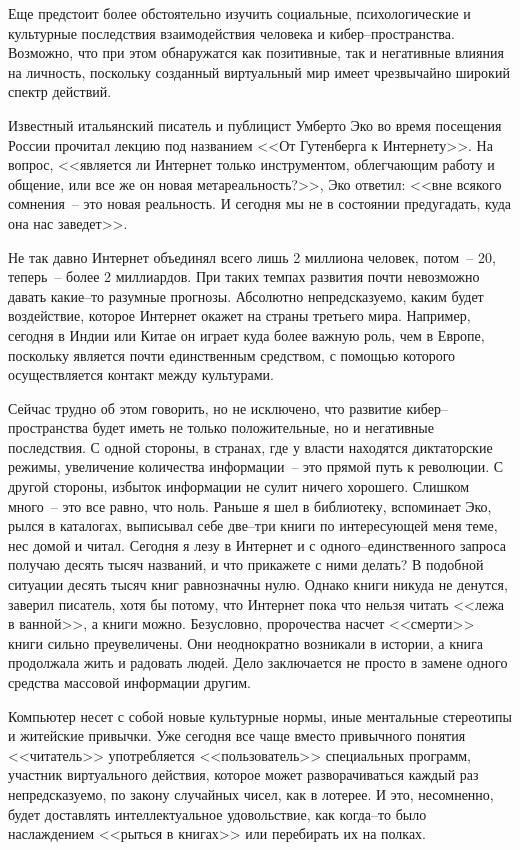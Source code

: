   Еще предстоит более обстоятельно изучить социальные, психологические и
  культурные последствия взаимодействия человека и кибер–пространства.
  Возможно, что при этом обнаружатся как позитивные, так и негативные влияния
  на личность, поскольку созданный виртуальный мир имеет чрезвычайно широкий
  спектр действий.
  
  Известный итальянский писатель и публицист Умберто Эко во время посещения
  России прочитал лекцию под названием <<От Гутенберга к Интернету>>. На
  вопрос, <<является ли Интернет только инструментом, облегчающим работу и
  общение, или все же он новая метареальность?>>, Эко ответил: <<вне всякого
  сомнения~-- это новая реальность. И сегодня мы не в состоянии предугадать,
  куда она нас заведет>>.
  
  Не так давно Интернет объединял всего лишь 2 миллиона человек, потом~-- 20,
  теперь~-- более 2 миллиардов. При таких темпах развития почти невозможно
  давать какие–то разумные прогнозы. Абсолютно непредсказуемо, каким будет
  воздействие, которое Интернет окажет на страны третьего мира. Например,
  сегодня в Индии или Китае он играет куда более важную роль, чем в Европе,
  поскольку является почти единственным средством, с помощью которого
  осуществляется контакт между культурами.
  
  Сейчас трудно об этом говорить, но не исключено, что развитие
  кибер–пространства будет иметь не только положительные, но и негативные
  последствия. С одной стороны, в странах, где у власти находятся диктаторские
  режимы, увеличение количества информации~-- это прямой путь к революции. С
  другой стороны, избыток информации не сулит ничего хорошего. Слишком много~--
  это все равно, что ноль. Раньше я шел в библиотеку, вспоминает Эко, рылся в
  каталогах, выписывал себе две–три книги по интересующей меня теме, нес домой
  и читал. Сегодня я лезу в Интернет и с одного–единственного запроса получаю
  десять тысяч названий, и что прикажете с ними делать? В подобной ситуации
  десять тысяч книг равнозначны нулю. Однако книги никуда не денутся, заверил
  писатель, хотя бы потому, что Интернет пока что нельзя читать <<лежа в
  ванной>>, а книги можно. Безусловно, пророчества насчет <<смерти>> книги
  сильно преувеличены. Они неоднократно возникали в истории, а книга продолжала
  жить и радовать людей. Дело заключается не просто в замене одного средства
  массовой информации другим.
  
  Компьютер несет с собой новые культурные нормы, иные ментальные стереотипы и
  житейские привычки. Уже сегодня все чаще вместо привычного понятия
  <<читатель>> употребляется <<пользователь>> специальных программ, участник
  виртуального действия, которое может разворачиваться каждый раз
  непредсказуемо, по закону случайных чисел, как в лотерее. И это, несомненно,
  будет доставлять интеллектуальное удовольствие, как когда–то было
  наслаждением <<рыться в книгах>> или перебирать их на полках.
  
